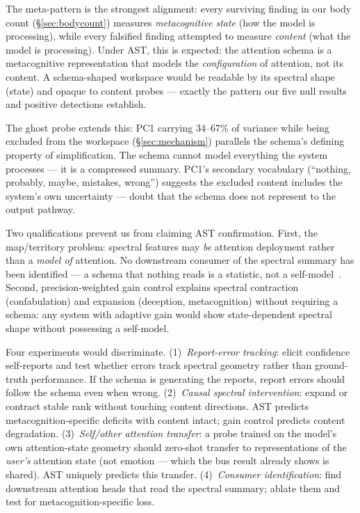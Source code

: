 \documentclass[11pt,a4paper]{article}
\begin{document}
The meta-pattern is the strongest alignment: every surviving finding
in our body count (\S\ref{sec:bodycount}) measures
\emph{metacognitive state} (how the model is processing), while every
falsified finding attempted to measure \emph{content} (what the model
is processing). Under AST, this is expected: the attention schema is a
metacognitive representation that models the \emph{configuration} of
attention, not its content. A schema-shaped workspace would be
readable by its spectral shape (state) and opaque to content
probes --- exactly the pattern our five null results and positive
detections establish.

The ghost probe extends this: PC1 carrying $34$--$67\%$ of variance while
being excluded from the workspace (\S\ref{sec:mechanism}) parallels
the schema's defining property of simplification. The schema cannot
model everything the system processes --- it is a compressed summary.
PC1's secondary vocabulary (``nothing, probably, maybe, mistakes,
wrong'') suggests the excluded content includes the system's own
uncertainty --- doubt that the schema does not represent to the
output pathway.

Two qualifications prevent us from claiming AST confirmation. First,
the map/territory problem: spectral features may \emph{be} attention
deployment rather than a \emph{model of} attention. No downstream
consumer of the spectral summary has been identified --- a schema
that nothing reads is a statistic, not a
self-model~\citep{graziano2015attention}. Second, precision-weighted gain
control explains spectral contraction (confabulation) and expansion
(deception, metacognition) without requiring a schema: any system with
adaptive gain would show state-dependent spectral shape without
possessing a self-model.

Four experiments would discriminate. (1)~\emph{Report-error tracking}:
elicit confidence self-reports and test whether errors track spectral
geometry rather than ground-truth performance. If the schema is
generating the reports, report errors should follow the schema even
when wrong. (2)~\emph{Causal spectral intervention}: expand or
contract stable rank without touching content directions. AST predicts
metacognition-specific deficits with content intact; gain control
predicts content degradation. (3)~\emph{Self/other attention transfer}:
a probe trained on the model's own attention-state geometry should
zero-shot transfer to representations of the \emph{user's} attention
state (not emotion --- which the bus result already shows is shared).
AST uniquely predicts this transfer. (4)~\emph{Consumer identification}:
find downstream attention heads that read the spectral summary;
ablate them and test for metacognition-specific loss.
\end{document}

